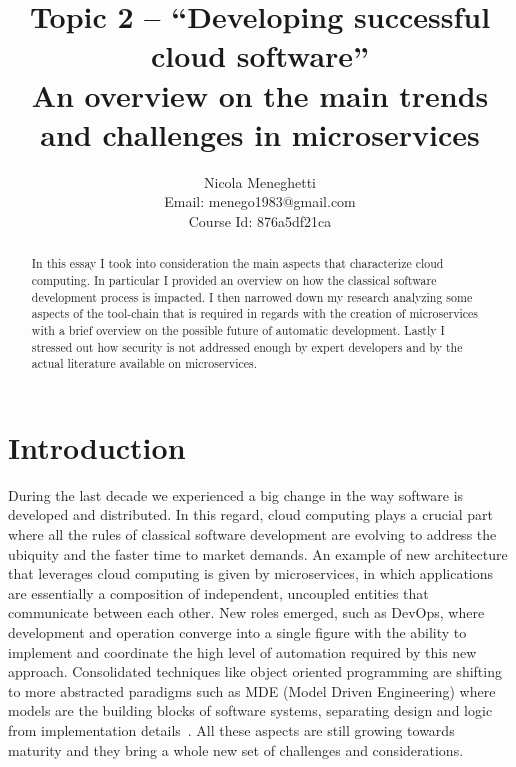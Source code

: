 \documentclass[a4paper, 10pt, conference]{ieeeconf}
\title{Topic 2 -- ``Developing successful cloud software'' \\
\large{An overview on the main trends and challenges in microservices}} %
\author{Nicola Meneghetti \\
	Email: menego1983@gmail.com \\ 
	Course Id: 876a5df21ca
}
\begin{document}
\maketitle
\thispagestyle{empty}
\pagestyle{empty}

\begin{abstract}

In this essay I took into consideration the main aspects that characterize cloud computing. In particular I provided an overview on how the classical software development process is impacted. I then narrowed down my research analyzing some aspects of the tool-chain that is required in regards with the creation of microservices with a brief overview on the possible future of automatic development. Lastly I stressed out how security is not addressed enough by expert developers and by the actual literature available on microservices.

\end{abstract}

\section{Introduction}

During the last decade we experienced a big change in the way software is developed and distributed. In this regard, cloud computing plays a crucial part where all the rules of classical software development are evolving to address the ubiquity and the faster time to market demands. An example of new architecture that leverages cloud computing is given by microservices, in which applications are essentially a composition of independent, uncoupled entities that communicate between each other. New roles emerged, such as DevOps, where development and operation converge into a single figure with the ability to implement and coordinate the high level of automation required by this new approach. Consolidated techniques like object oriented programming are shifting to more abstracted paradigms such as MDE (Model Driven Engineering) where models are the building blocks of software systems, separating design and logic from implementation details~\cite{overview-platforms, fuggetta2014software}. All these aspects are still growing towards maturity and they bring a whole new set of challenges and considerations.
\end{document}
